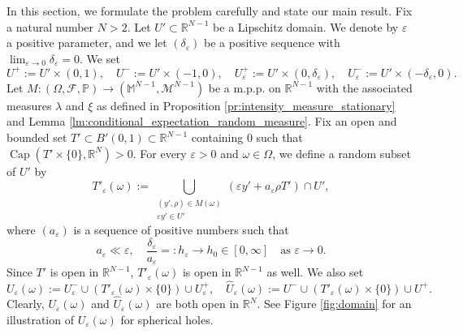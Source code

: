 \documentclass{article}
\numberwithin{equation}{section}
\theoremstyle{definition}
\theoremstyle{remark}
\newcommand{\cpct}{\operatorname{Cap}}
\begin{document}
In this section, we formulate the problem carefully and state our main result. Fix a natural number $N > 2$. Let $U' \subset \mathbb{R}^{N - 1}$ be a Lipschitz domain. We denote by $\varepsilon$ a positive parameter, and we let $(\delta_\varepsilon)$ be a positive sequence with $\lim_{\varepsilon \to 0} \delta_\varepsilon = 0$. We set
\[
U^+ := U' \times (0, 1), \quad U^- := U' \times (-1, 0), \quad U_\varepsilon^+ := U' \times (0, \delta_\varepsilon), \quad U_\varepsilon^- := U' \times (-\delta_\varepsilon, 0).
\]
Let $M : (\Omega, \mathcal{F}, \mathbb{P}) \rightarrow (\mathbb{M}^{N - 1}, \mathcal{M}^{N - 1})$ be a m.p.p. on $\mathbb{R}^{N - 1}$ with the associated measures $\lambda$ and $\xi$ as defined in Proposition \ref{pr:intensity_measure_stationary} and Lemma \ref{lm:conditional_expectation_random_measure}. Fix an open and bounded set $T' \subset B'(0, 1) \subset \mathbb{R}^{N - 1}$ containing $0$ such that $\cpct(T' \times \{0\}, \mathbb{R}^N) > 0$. For every $\varepsilon > 0$ and $\omega \in \Omega$, we define a random subset of $U'$ by
\begin{equation} \label{eq:random_set}
    T'_\varepsilon(\omega) := \bigcup \limits_{\substack{(y', \rho) \in M(\omega) \\ \varepsilon y' \in U'}} (\varepsilon y' + a_\varepsilon \rho T') \cap U',
\end{equation}
where $(a_\varepsilon)$ is a sequence of positive numbers such that
\[
a_\varepsilon \ll \varepsilon, \quad \frac{\delta_\varepsilon}{a_\varepsilon} =: h_\varepsilon \to h_0 \in [0, \infty] \quad \text{as } \varepsilon \to 0.
\]
Since $T'$ is open in $\mathbb{R}^{N - 1}$, $T'_\varepsilon(\omega)$ is open in $\mathbb{R}^{N - 1}$ as well. We also set
\[
U_\varepsilon(\omega) := U_\varepsilon^- \cup (T'_\varepsilon(\omega) \times \{0\}) \cup U_\varepsilon^+, \quad \hat{U}_\varepsilon(\omega) := U^- \cup (T'_\varepsilon(\omega) \times \{0\}) \cup U^+.
\]
Clearly, $U_\varepsilon(\omega)$ and $\hat{U}_\varepsilon(\omega)$ are both open in $\mathbb{R}^N$. See Figure \ref{fig:domain} for an illustration of $U_\varepsilon(\omega)$ for spherical holes.
\end{document}
